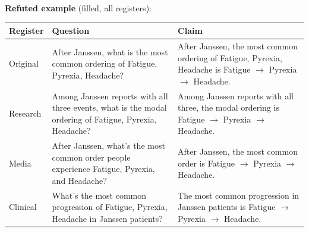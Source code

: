 \documentclass[11pt]{article}
\begin{document}
\vspace{3pt}
\textbf{Refuted example} (filled, all registers): \\
\begin{tabularx}{\linewidth}{@{}l L L@{}}
\toprule
\textbf{Register} & \textbf{Question} & \textbf{Claim} \\
\midrule
Original & After Janssen, what is the most common ordering of Fatigue, Pyrexia, Headache? & After Janssen, the most common ordering of Fatigue, Pyrexia, Headache is Fatigue $\rightarrow$  Pyrexia $\rightarrow$  Headache. \\
Research & Among Janssen reports with all three events, what is the modal ordering of Fatigue, Pyrexia, Headache? & Among Janssen reports with all three, the modal ordering is Fatigue $\rightarrow$  Pyrexia $\rightarrow$  Headache. \\
Media & After Janssen, what's the most common order people experience Fatigue, Pyrexia, and Headache? & After Janssen, the most common order is Fatigue $\rightarrow$  Pyrexia $\rightarrow$  Headache. \\
Clinical & What's the most common progression of Fatigue, Pyrexia, Headache in Janssen patients? & The most common progression in Janssen patients is Fatigue $\rightarrow$  Pyrexia $\rightarrow$  Headache. \\
\bottomrule
\end{tabularx}
\vspace{3pt}
\end{document}
